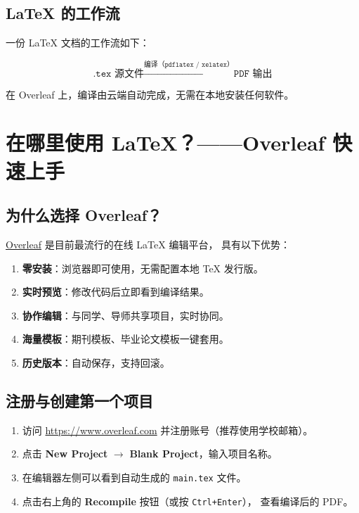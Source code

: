 \documentclass[12pt, a4paper]{article}
\begin{document}
\subsection{\LaTeX{} 的工作流}

一份 \LaTeX{} 文档的工作流如下：

\[
    \texttt{.tex 源文件}
    \xrightarrow{\texttt{编译（pdflatex / xelatex）}}
    \texttt{PDF 输出}
\]

在 Overleaf 上，编译由云端自动完成，无需在本地安装任何软件。

\section{在哪里使用 \LaTeX{}？——Overleaf 快速上手}

\subsection{为什么选择 Overleaf？}

\href{https://www.overleaf.com}{Overleaf} 是目前最流行的在线 \LaTeX{} 编辑平台，
具有以下优势：

\begin{enumerate}
    \item \textbf{零安装}：浏览器即可使用，无需配置本地 \TeX{} 发行版。
    \item \textbf{实时预览}：修改代码后立即看到编译结果。
    \item \textbf{协作编辑}：与同学、导师共享项目，实时协同。
    \item \textbf{海量模板}：期刊模板、毕业论文模板一键套用。
    \item \textbf{历史版本}：自动保存，支持回滚。
\end{enumerate}

\subsection{注册与创建第一个项目}

\begin{enumerate}
    \item 访问 \url{https://www.overleaf.com} 并注册账号（推荐使用学校邮箱）。
    \item 点击 \textbf{New Project} $\to$ \textbf{Blank Project}，输入项目名称。
    \item 在编辑器左侧可以看到自动生成的 \texttt{main.tex} 文件。
    \item 点击右上角的 \textbf{Recompile} 按钮（或按 \texttt{Ctrl+Enter}），
          查看编译后的 PDF。
\end{enumerate}
\end{document}
